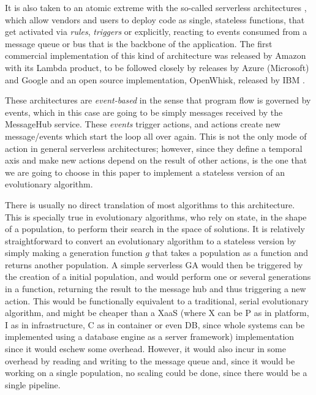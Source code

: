 \documentclass{llncs}
\begin{document}
    It is also taken to an atomic extreme
    with the so-called serverless architectures \cite{Varghese2018849},
    which allow vendors and users to deploy code as single, stateless
    functions, that get activated via {\em rules}, {\em triggers} or
    explicitly, reacting to events consumed from
    a message queue or bus that
    is the backbone of the application. The first commercial
    implementation of this kind of architecture was released by Amazon
    with its Lambda product, to be followed closely by releases by Azure
    (Microsoft) and Google and an open source implementation, OpenWhisk,
    released by IBM \cite{Baldini2016287}.

  These architectures are {\em event-based} in the sense that program
  flow is governed by events, which in this case are going to be simply
  messages received by the MessageHub service. These {\em events} trigger actions,
  and actions create new message/events which start the loop all over
  again. This is not the only mode of action in general serverless
  architectures; however, since they define a temporal axis and make new
  actions depend on the result of other actions, is the one that we are
  going to choose in this paper to implement a stateless version of an
  evolutionary algorithm.

  There is usually no direct translation of most algorithms to this
  architecture. This is specially true in evolutionary algorithms, who
  rely on state, in the shape of a population, to perform their search
  in the space of solutions. It is relatively straightforward to convert
  an evolutionary algorithm to a stateless version by simply making a
  {\sf generation} function $g$ that takes a population as a function
  and returns another population. A simple serverless GA would then be
  triggered by the creation of a initial population, and would perform
  one or several generations in a function, returning the result to the
  message hub and thus triggering a new action. This would be
  functionally equivalent to a traditional, serial evolutionary
  algorithm, and might be cheaper than a XaaS (where X can be P as in
  platform, I as in infrastructure, C as in container or even DB, since
  whole systems can be implemented using a database engine as a server framework) 
  implementation since it
  would eschew some overhead. However, it would also incur in some
  overhead by reading and writing to the message queue and, since it
  would be working on a single population, no scaling could be done,
  since there would be a single pipeline.
\end{document}
